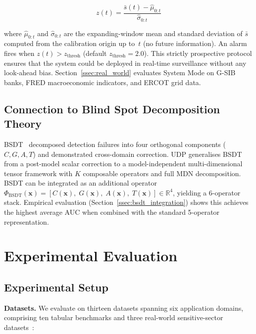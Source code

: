 \documentclass[journal]{IEEEtran}
\newcommand{\R}{\mathbb{R}}
\begin{document}
\begin{equation}
z(t) = \frac{\bar{s}(t) - \hat{\mu}_{0:t}}{\hat{\sigma}_{0:t}}
\label{eq:zscore}
\end{equation}

where $\hat{\mu}_{0:t}$ and $\hat{\sigma}_{0:t}$ are the expanding-window mean and standard deviation of $\bar{s}$ computed from the calibration origin up to~$t$ (no future information).  An alarm fires when $z(t) > z_{\text{thresh}}$ (default $z_{\text{thresh}} = 2.0$).  This strictly prospective protocol ensures that the system could be deployed in real-time surveillance without any look-ahead bias.  Section~\ref{ssec:real_world} evaluates System Mode on G-SIB banks, FRED macroeconomic indicators, and ERCOT grid data.

\subsection{Connection to Blind Spot Decomposition Theory}
\label{sec:bsdt}

BSDT~\cite{odeyemi2025bsdt} decomposed detection failures into four orthogonal components ($C, G, A, T$) and demonstrated cross-domain correction.  UDP generalises BSDT from a post-model scalar correction to a model-independent multi-dimensional tensor framework with $K$ composable operators and full MDN decomposition.  BSDT can be integrated as an additional operator $\Phi_{\text{BSDT}}(\mathbf{x}) = [C(\mathbf{x}),\; G(\mathbf{x}),\; A(\mathbf{x}),\; T(\mathbf{x})] \in \R^4$, yielding a 6-operator stack.  Empirical evaluation (Section~\ref{ssec:bsdt_integration}) shows this achieves the highest average AUC when combined with the standard 5-operator representation.

\section{Experimental Evaluation}
\label{sec:experiments}

\subsection{Experimental Setup}
\label{ssec:setup}

\textbf{Datasets.} We evaluate on thirteen datasets spanning six application domains, comprising ten tabular benchmarks and three real-world sensitive-sector datasets~\cite{han2022adbench}:
\end{document}
